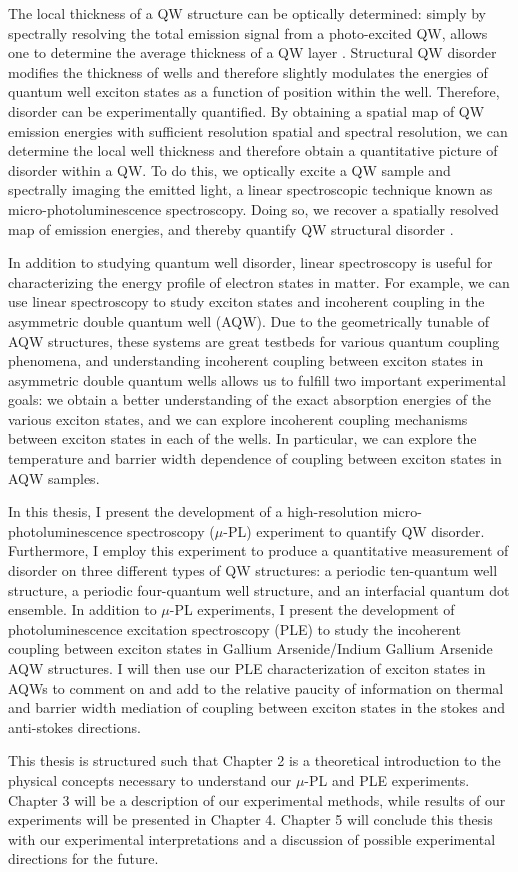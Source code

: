 \indent The local thickness of a QW structure can be optically determined: simply by spectrally resolving the total emission signal from a photo-excited QW, allows one to determine the average thickness of a QW layer \cite{gilleo}. Structural QW disorder modifies the thickness of wells and therefore slightly modulates the energies of quantum well exciton states as a function of position within the well. Therefore, disorder can be experimentally quantified. By obtaining a spatial map of QW emission energies with sufficient resolution spatial and spectral resolution, we can determine the local well thickness and therefore obtain a quantitative picture of disorder within a QW. To do this, we optically excite a QW sample and spectrally imaging the emitted light, a linear spectroscopic technique known as micro-photoluminescence spectroscopy. Doing so, we recover a spatially resolved map of emission energies, and thereby quantify QW structural disorder \cite{yoshitaapp}.

\indent In addition to studying quantum well disorder, linear spectroscopy is useful for characterizing the energy profile of electron states in matter. For example, we can use linear spectroscopy to study exciton states and incoherent coupling in the asymmetric double quantum well (AQW). Due to the geometrically tunable of AQW structures, these systems are great testbeds for various quantum coupling phenomena, and understanding incoherent coupling between exciton states in asymmetric double quantum wells allows us to fulfill two important experimental goals: we obtain a better understanding of the exact absorption energies of the various exciton states, and we can explore incoherent coupling mechanisms between exciton states in each of the wells. In particular, we can explore the temperature and barrier width dependence of coupling between exciton states in AQW samples.


\indent In this thesis, I present the development of a high-resolution micro-photoluminescence spectroscopy ($\mu$-PL) experiment to quantify QW disorder. Furthermore, I employ this experiment to produce a quantitative measurement of disorder on three different types of QW structures: a periodic ten-quantum well structure, a periodic four-quantum well structure, and an interfacial quantum dot ensemble.  In addition to $\mu$-PL experiments, I present the development of photoluminescence excitation spectroscopy (PLE) to study the incoherent coupling between exciton states in Gallium Arsenide/Indium Gallium Arsenide AQW structures. I will then use our PLE characterization of exciton states in AQWs to comment on and add to the relative paucity of information on thermal and barrier width mediation of coupling between exciton states in the stokes and anti-stokes directions. 

\indent This thesis is structured such that Chapter 2 is a theoretical introduction to the physical concepts necessary to understand our $\mu$-PL and PLE experiments. Chapter 3 will be a description of our experimental methods, while results of our experiments will be presented in Chapter 4. Chapter 5 will conclude this thesis with our experimental interpretations and a discussion of possible experimental directions for the future. 